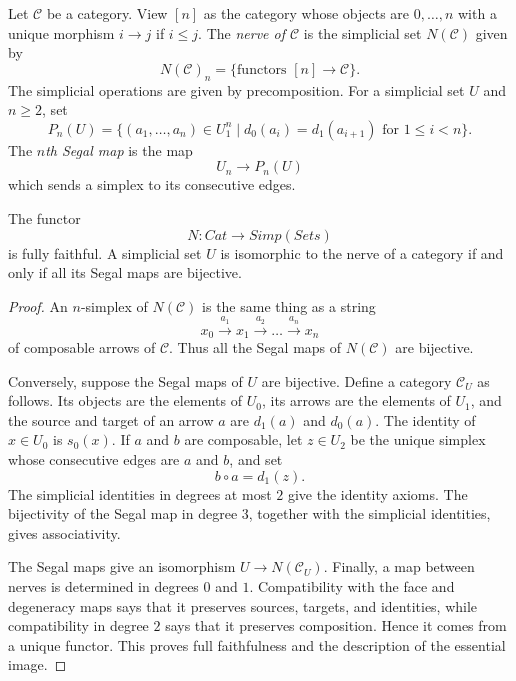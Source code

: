 \begin{definition}
\label{definition-nerve-category}
Let $\mathcal{C}$ be a category. View $[n]$ as the category whose objects are
$0, \ldots, n$ with a unique morphism $i \to j$ if $i \leq j$. The
{\it nerve of $\mathcal{C}$} is the simplicial set $N(\mathcal{C})$ given by
$$
N(\mathcal{C})_n = \{\text{functors }[n] \longrightarrow \mathcal{C}\}.
$$
The simplicial operations are given by precomposition. For a simplicial set
$U$ and $n \geq 2$, set
$$
P_n(U) = \{(a_1, \ldots, a_n) \in U_1^n \mid
d_0(a_i) = d_1(a_{i + 1})\text{ for }1 \leq i < n\}.
$$
The {\it $n$th Segal map} is the map
$$
U_n \longrightarrow P_n(U)
$$
which sends a simplex to its consecutive edges.
\end{definition}

\begin{lemma}
\label{lemma-characterize-nerves-categories}
The functor
$$
N : \textit{Cat} \longrightarrow \textit{Simp}(\textit{Sets})
$$
is fully faithful. A simplicial set $U$ is isomorphic to the nerve of a
category if and only if all its Segal maps are bijective.
\end{lemma}

\begin{proof}
An $n$-simplex of $N(\mathcal{C})$ is the same thing as a string
$$
x_0 \xrightarrow{a_1} x_1 \xrightarrow{a_2} \ldots
\xrightarrow{a_n} x_n
$$
of composable arrows of $\mathcal{C}$. Thus all the Segal maps of
$N(\mathcal{C})$ are bijective.

Conversely, suppose the Segal maps of $U$ are bijective. Define a category
$\mathcal{C}_U$ as follows. Its objects are the elements of $U_0$, its arrows
are the elements of $U_1$, and the source and target of an arrow $a$ are
$d_1(a)$ and $d_0(a)$. The identity of $x \in U_0$ is $s_0(x)$. If $a$ and
$b$ are composable, let $z \in U_2$ be the unique simplex whose consecutive
edges are $a$ and $b$, and set
$$
b \circ a = d_1(z).
$$
The simplicial identities in degrees at most $2$ give the identity axioms.
The bijectivity of the Segal map in degree $3$, together with the simplicial
identities, gives associativity.

The Segal maps give an isomorphism $U \to N(\mathcal{C}_U)$. Finally, a map
between nerves is determined in degrees $0$ and $1$. Compatibility with the
face and degeneracy maps says that it preserves sources, targets, and
identities, while compatibility in degree $2$ says that it preserves
composition. Hence it comes from a unique functor. This proves full
faithfulness and the description of the essential image.
\end{proof}

